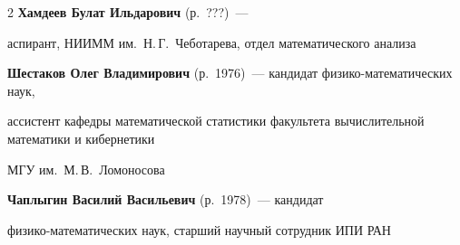 \begin{multicols}{2}
\textbf{Хамдеев Булат Ильдарович} (р.\   ???)~---

аспирант, НИИММ им.~Н.\,Г.~Чеботарева, отдел математического анализа



\vspace*{6pt}



\noindent

\textbf{Шестаков Олег Владимирович} (р.\ 1976)~--- кандидат физико-математических наук,

ассистент ка\-фед\-ры математической статистики факультета вычислительной математики и кибернетики

МГУ им.~М.\,В.~Ломоносова









\noindent

\textbf{Чаплыгин Василий Васильевич} (р.\ 1978)~---  кандидат 

физико-математических наук, старший научный сотрудник ИПИ РАН


\end{multicols}

